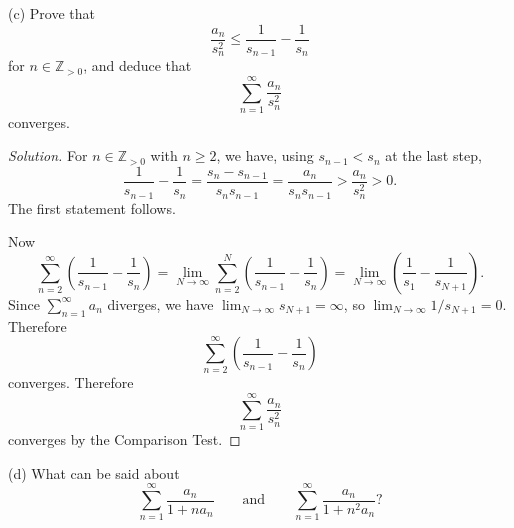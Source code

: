 \documentclass[10pt]{amsart}
\newcommand{\I}{\infty}
\newcommand{\andeqn}{\qquad {\mbox{and}} \qquad}
\newcommand{\limi}[1]{\lim_{{#1} \to \infty}}
\theoremstyle{definition}
\newcommand{\N}{{\mathbb{Z}}_{> 0}}
\begin{document}
(c)
Prove that
\[
\frac{a_n}{s_n^2} \leq \frac{1}{s_{n - 1}} - \frac{1}{s_n}
\]
for $n \in \N$,
and deduce that
\[
\sum_{n = 1}^{\infty} \frac{a_n}{s_n^2}
\]
converges.

\begin{proof}[Solution]
For $n \in \N$ with $n \geq 2$, we have,
using $s_{n - 1} < s_n$ at the last step,
\[
\frac{1}{s_{n - 1}} - \frac{1}{s_n}
  = \frac{s_n - s_{n - 1}}{s_n s_{n - 1}}
  = \frac{a_n}{s_n s_{n - 1}}
  > \frac{a_n}{s_n^2}
  > 0.
\]
The first statement follows.

Now
%
\[
\sum_{n = 2}^{\infty} \left( \frac{1}{s_{n - 1}} - \frac{1}{s_n} \right)
 = \limi{N} \sum_{n = 2}^{N}
     \left( \frac{1}{s_{n - 1}} - \frac{1}{s_n} \right)
 = \limi{N} \left( \frac{1}{s_1} - \frac{1}{s_{N + 1}} \right).
\]
%
Since $\sum_{n = 1}^{\infty} a_n$ diverges,
we have $\limi{N} s_{N + 1} = \I$,
so
$\limi{N} 1 / s_{N + 1} = 0$.
Therefore
\[
\sum_{n = 2}^{\infty} \left( \frac{1}{s_{n - 1}} - \frac{1}{s_n} \right)
\]
converges.
Therefore
\[
\sum_{n = 1}^{\infty} \frac{a_n}{s_n^2}
\]
converges by the Comparison Test.
\end{proof}


(d)
What can be said about
\[
\sum_{n = 1}^{\infty} \frac{a_n}{1 + n a_n}
\andeqn
\sum_{n = 1}^{\infty} \frac{a_n}{1 + n^2 a_n}?
\]
\end{document}
